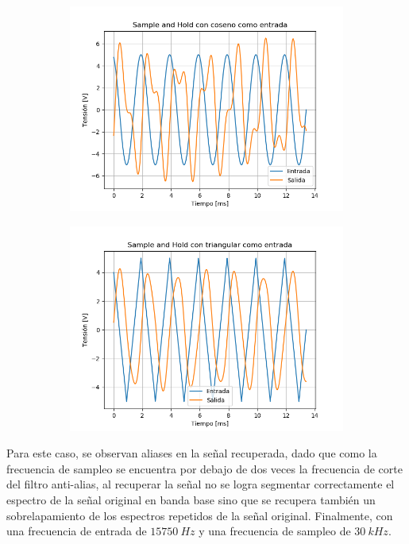 \begin{figure}[H]
	\begin{subfigure}{.5\textwidth}
	\centering
	\includegraphics[width=\textwidth]{ImagenesEjercicio6/puntob1/SH - Cos.png}
	\end{subfigure}
	\begin{subfigure}{.5\textwidth}
	\centering
	\includegraphics[width=\textwidth]{ImagenesEjercicio6/puntob1/SH - Tri.png}
	\end{subfigure}
\end{figure}

Para este caso, se observan aliases en la señal recuperada, dado que como la frecuencia de sampleo se encuentra por debajo de dos veces la frecuencia de corte del filtro anti-alias, al recuperar la señal no se logra segmentar correctamente el espectro de la señal original en banda base sino que se recupera también un sobrelapamiento de los espectros repetidos de la señal original.
Finalmente, con una frecuencia de entrada de $15750 \ Hz$ y una frecuencia de sampleo de $30 \ kHz$.

